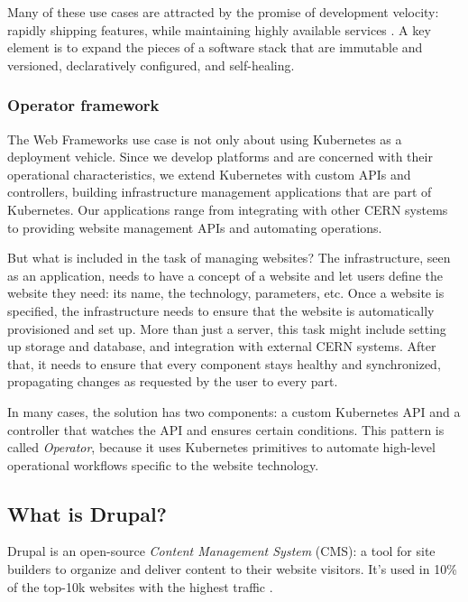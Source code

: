 Many of these use cases are attracted by the promise of development velocity:
rapidly shipping features, while maintaining highly available services \cite{hightowerKubernetesRunningDive2017}.
A key element is to expand the pieces of a software stack that are immutable and versioned, declaratively configured, and self-healing.

\subsubsection*{Operator framework}
\label{sec-operators}

The Web Frameworks use case is not only about using Kubernetes as a deployment vehicle.
Since we develop platforms and are concerned with their operational characteristics,
we extend Kubernetes with custom APIs and controllers, building infrastructure management applications that are part of Kubernetes.
Our applications range from integrating with other CERN systems to providing website management APIs and automating operations.

But what is included in the task of managing websites?
The infrastructure, seen as an application, needs to have a concept of a website and let users define the website they need: its name, the technology, parameters, etc.
Once a website is specified, the infrastructure needs to ensure that the website is automatically provisioned and set up.
More than just a server, this task might include setting up storage and database, and integration with external CERN systems.
After that, it needs to ensure that every component stays healthy and synchronized, propagating changes as requested by the user to every part.

In many cases, the solution has two components: a custom Kubernetes API and a controller that watches the API and ensures certain conditions.
This pattern is called \emph{Operator}, because it uses Kubernetes primitives to automate high-level operational workflows specific to the website technology.

\subsection{What is Drupal?}
\label{what-is-drupal}

Drupal is an open-source \emph{Content Management System} (CMS): a tool for site builders to organize and deliver content to their website visitors.
It's used in 10\% of the top-10k websites with the highest traffic \cite{builtwithptyltdOpenSourceUsage,q-successdigelbmanngmbhWordPressVsDrupal}.

